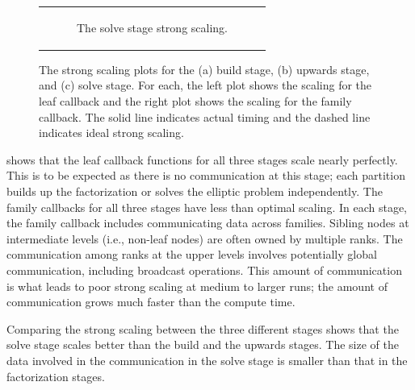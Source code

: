 \begin{figure}
\begin{tabular}{c}
\begin{subfigure}[t]{0.95\textwidth}
            \caption{The solve stage strong scaling.}
            \label{subfig:strong_solve}
        \end{subfigure}
        \\
    \end{tabular}
    \caption{The strong scaling plots for the (a) build stage, (b) upwards stage, and (c) solve stage. For each, the left plot shows the scaling for the leaf callback and the right plot shows the scaling for the family callback. The solid line indicates actual timing and the dashed line indicates ideal strong scaling.}
    \label{fig:strong_scaling_plots}
\end{figure}

 shows that the leaf callback functions for all three stages scale nearly perfectly. This is to be expected as there is no communication at this stage; each partition builds up the factorization or solves the elliptic problem independently. The family callbacks for all three stages have less than optimal scaling. In each stage, the family callback includes communicating data across families. Sibling nodes at intermediate levels (i.e., non-leaf nodes) are often owned by multiple ranks. The communication among ranks at the upper levels involves potentially global communication, including broadcast operations. This amount of communication is what leads to poor strong scaling at medium to larger runs; the amount of communication grows much faster than the compute time.

Comparing the strong scaling between the three different stages shows that the solve stage scales better than the build and the upwards stages. The size of the data involved in the communication in the solve stage is smaller than that in the factorization stages.



